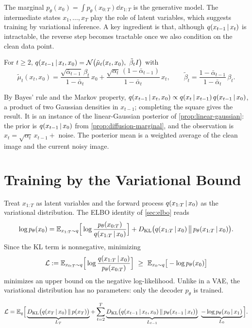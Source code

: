 The marginal $p_\theta(x_0)=\int p_\theta(x_{0:T})\dd x_{1:T}$ is the generative model. The intermediate states $x_1,\dots,x_T$ play the role of latent variables, which suggests training by variational inference. A key ingredient is that, although $q(x_{t-1}\,|\, x_t)$ is intractable, the reverse step becomes tractable once we also condition on the clean data point.

\begin{proposition}\label{prop:forward-posterior}
For $t\ge2$, $q(x_{t-1}\,|\, x_t,x_0)=\mathcal{N}\big(\tilde\mu_t(x_t,x_0),\ \tilde\beta_tI\big)$ with
\[
\tilde\mu_t(x_t,x_0)=\frac{\sqrt{\bar\alpha_{t-1}}\,\beta_t}{1-\bar\alpha_t}\,x_0+\frac{\sqrt{\alpha_t}\,(1-\bar\alpha_{t-1})}{1-\bar\alpha_t}\,x_t,\qquad \tilde\beta_t=\frac{1-\bar\alpha_{t-1}}{1-\bar\alpha_t}\,\beta_t.
\]
\end{proposition}

By Bayes' rule and the Markov property, $q(x_{t-1}\,|\, x_t,x_0)\propto q(x_t\,|\, x_{t-1})\,q(x_{t-1}\,|\, x_0)$, a product of two Gaussian densities in $x_{t-1}$; completing the square gives the result. It is an instance of the linear-Gaussian posterior of \cref{prop:linear-gaussian}: the prior is $q(x_{t-1}\,|\, x_0)$ from \cref{prop:diffusion-marginal}, and the observation is $x_t=\sqrt{\alpha_t}\,x_{t-1}+$ noise. The posterior mean is a weighted average of the clean image and the current noisy image.

\section{Training by the Variational Bound}\label{sec:diffusion-elbo}

Treat $x_{1:T}$ as latent variables and the forward process $q(x_{1:T}\,|\, x_0)$ as the variational distribution. The ELBO identity of \cref{sec:elbo} reads
\[
\log p_\theta(x_0)=\mathbb{E}_{x_{1:T}\sim q}\Big[\log\frac{p_\theta(x_{0:T})}{q(x_{1:T}\,|\, x_0)}\Big]+D_{\mathrm{KL}}\big(q(x_{1:T}\,|\, x_0)\,\big\|\,p_\theta(x_{1:T}\,|\, x_0)\big).
\]
Since the KL term is nonnegative, minimizing
\[
\cL:=\E_{x_{0:T}\sim q}\Big[\log\frac{q(x_{1:T}\given x_0)}{p_\theta(x_{0:T})}\Big]\ \ge\ \E_{x_0\sim q}\big[-\log p_\theta(x_0)\big]
\]
minimizes an upper bound on the negative log-likelihood. Unlike in a VAE, the variational distribution has no parameters: only the decoder $p_\theta$ is trained.

\begin{proposition}\label{prop:diffusion-bound}
\[
\cL=\E_q\Big[\underbrace{\KL\big(q(x_T\given x_0)\,\|\,p(x_T)\big)}_{L_T}+\sum_{t=2}^T\underbrace{\KL\big(q(x_{t-1}\given x_t,x_0)\,\|\,p_\theta(x_{t-1}\given x_t)\big)}_{L_{t-1}}\ \underbrace{-\log p_\theta(x_0\given x_1)}_{L_0}\Big].
\]
\end{proposition}

